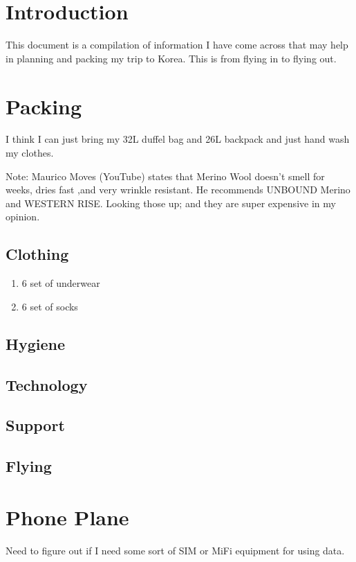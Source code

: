 \documentclass[12pt]{report} %
\begin{document}
\listoffigures
\newpage

\listoftables
{}
\newpage

\lstlistoflistings
{}
\newpage
\setcounter{page}{1}


\chapter{Introduction}
This document is a compilation of information I have come across that may help in planning and packing my trip to Korea. This is from flying in to flying out. 

\chapter{Packing}
I think I can just bring my 32L duffel bag and 26L backpack and just hand wash my clothes. 

Note:
Maurico Moves (YouTube) states that Merino Wool doesn't smell for weeks, dries fast ,and very wrinkle resistant. He recommends UNBOUND Merino and WESTERN RISE. Looking those up; and they are super expensive in my opinion.
\section*{Clothing}
\begin{enumerate}
	\item 6 set of underwear
	\item 6 set of socks
\end{enumerate}
\section*{Hygiene}
\section*{Technology}
\section*{Support}
\section*{Flying}

\chapter{Phone Plane}
Need to figure out if I need some sort of SIM or MiFi equipment for using data. 
\end{document}
